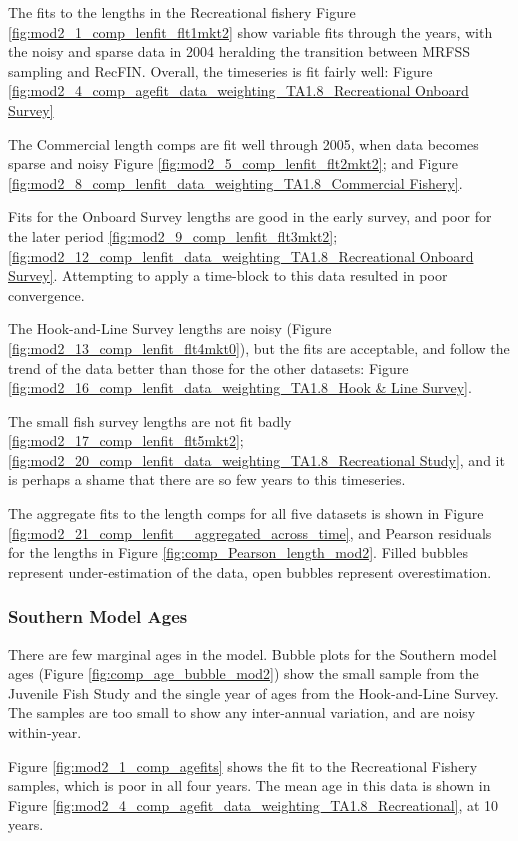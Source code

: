 \documentclass[12pt,]{article}
\begin{document}
The fits to the lengths in the Recreational fishery Figure
\ref{fig:mod2_1_comp_lenfit_flt1mkt2} show variable fits through the
years, with the noisy and sparse data in 2004 heralding the transition
between MRFSS sampling and RecFIN. Overall, the timeseries is fit fairly
well: Figure
\ref{fig:mod2_4_comp_agefit_data_weighting_TA1.8_Recreational Onboard Survey}

The Commercial length comps are fit well through 2005, when data becomes
sparse and noisy Figure \ref{fig:mod2_5_comp_lenfit_flt2mkt2}; and
Figure
\ref{fig:mod2_8_comp_lenfit_data_weighting_TA1.8_Commercial Fishery}.

Fits for the Onboard Survey lengths are good in the early survey, and
poor for the later period \ref{fig:mod2_9_comp_lenfit_flt3mkt2};
\ref{fig:mod2_12_comp_lenfit_data_weighting_TA1.8_Recreational Onboard Survey}.
Attempting to apply a time-block to this data resulted in poor
convergence.

The Hook-and-Line Survey lengths are noisy (Figure
\ref{fig:mod2_13_comp_lenfit_flt4mkt0}), but the fits are acceptable,
and follow the trend of the data better than those for the other
datasets: Figure
\ref{fig:mod2_16_comp_lenfit_data_weighting_TA1.8_Hook & Line Survey}.

The small fish survey lengths are not fit badly
\ref{fig:mod2_17_comp_lenfit_flt5mkt2};
\ref{fig:mod2_20_comp_lenfit_data_weighting_TA1.8_Recreational Study},
and it is perhaps a shame that there are so few years to this
timeseries.

The aggregate fits to the length comps for all five datasets is shown in
Figure \ref{fig:mod2_21_comp_lenfit__aggregated_across_time}, and
Pearson residuals for the lengths in Figure
\ref{fig:comp_Pearson_length_mod2}. Filled bubbles represent
under-estimation of the data, open bubbles represent overestimation.

\subsubsection{Southern Model Ages}\label{southern-model-ages}

There are few marginal ages in the model. Bubble plots for the Southern
model ages (Figure \ref{fig:comp_age_bubble_mod2}) show the small sample
from the Juvenile Fish Study and the single year of ages from the
Hook-and-Line Survey. The samples are too small to show any inter-annual
variation, and are noisy within-year.

Figure \ref{fig:mod2_1_comp_agefits} shows the fit to the Recreational
Fishery samples, which is poor in all four years. The mean age in this
data is shown in Figure
\ref{fig:mod2_4_comp_agefit_data_weighting_TA1.8_Recreational}, at 10
years.
\end{document}
